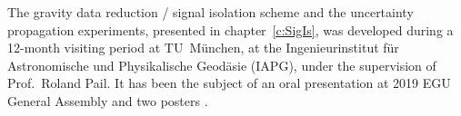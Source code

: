 The gravity data reduction / signal isolation scheme and the uncertainty propagation experiments, presented in chapter~\ref{c:SigIs}, was developed during a 12-month visiting period at TU~München, at the Ingenieurinstitut für Astronomische und Physikalische Geodäsie (IAPG), under the supervision of Prof.~Roland Pail.
It has been the subject of an oral presentation at 2019 EGU General Assembly \parencite{Pastorutti2019EGU} and two posters \parencites{Pastorutti2019LPS}{Pastorutti2019IUGG}.
